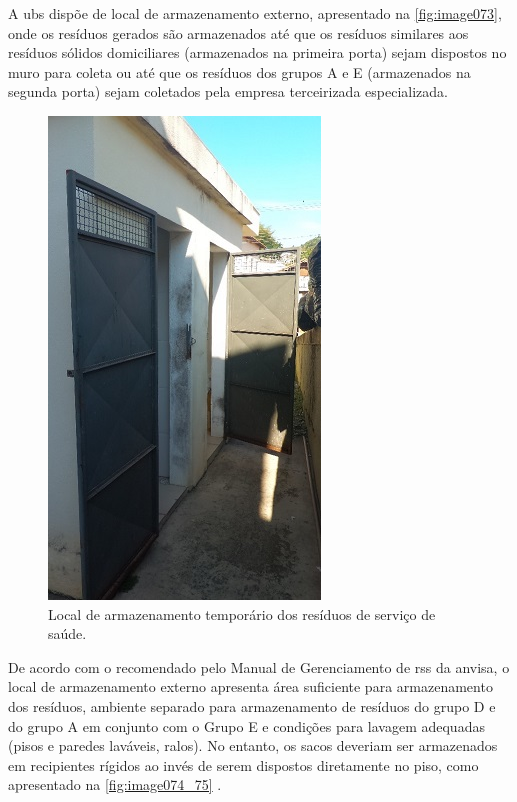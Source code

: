 	
	A \gls{ubs} dispõe de local de armazenamento externo, apresentado na \autoref{fig:image073}, onde os resíduos gerados são armazenados até que os resíduos similares aos resíduos sólidos domiciliares (armazenados na primeira porta) sejam dispostos no muro para coleta ou até que os resíduos dos grupos A e E (armazenados na segunda porta) sejam coletados pela empresa terceirizada especializada.
	
	\begin{figure}
		\centering
		\includegraphics[width=0.75\linewidth]{produtos/prodtres/image073}
		\caption{Local de armazenamento temporário dos resíduos de serviço de saúde.}
		\label{fig:image073}
	\end{figure}
	
	
	De acordo com o recomendado pelo Manual de Gerenciamento de \gls{rss} da \gls{anvisa}, o local de armazenamento externo apresenta área suficiente para armazenamento dos resíduos, ambiente separado para armazenamento de resíduos do grupo D e do grupo A em conjunto com o Grupo E e condições para lavagem adequadas (pisos e paredes laváveis, ralos). No entanto, os sacos deveriam ser armazenados em recipientes rígidos ao invés de serem dispostos diretamente no piso, como apresentado na \autoref{fig:image074_75} \cite{anvisa:2006}.
	
